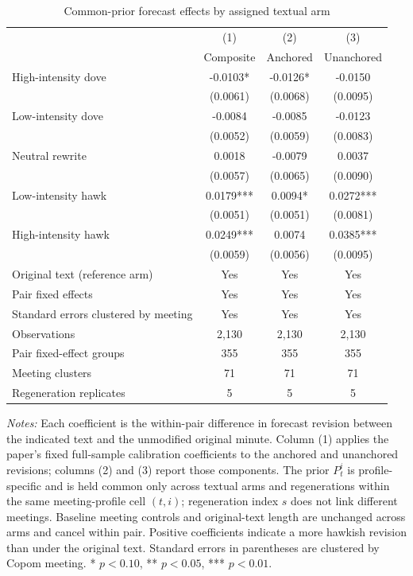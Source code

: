 \begin{table}[htbp]
\color{revisionred}
\centering
\begin{threeparttable}
\caption{Common-prior forecast effects by assigned textual arm}
\label{tab:common-prior-dose-arms}
\begin{footnotesize}
\begin{tabular}{lccc}
\toprule
 & (1) & (2) & (3) \\
 & Composite & Anchored & Unanchored \\
\midrule
High-intensity dove & -0.0103* & -0.0126* & -0.0150 \\
 & (0.0061) & (0.0068) & (0.0095) \\
Low-intensity dove & -0.0084 & -0.0085 & -0.0123 \\
 & (0.0052) & (0.0059) & (0.0083) \\
Neutral rewrite & 0.0018 & -0.0079 & 0.0037 \\
 & (0.0057) & (0.0065) & (0.0090) \\
Low-intensity hawk & 0.0179*** & 0.0094* & 0.0272*** \\
 & (0.0051) & (0.0051) & (0.0081) \\
High-intensity hawk & 0.0249*** & 0.0074 & 0.0385*** \\
 & (0.0059) & (0.0056) & (0.0095) \\
\midrule
Original text (reference arm) & Yes & Yes & Yes \\
Pair fixed effects & Yes & Yes & Yes \\
Standard errors clustered by meeting & Yes & Yes & Yes \\
Observations & 2,130 & 2,130 & 2,130 \\
Pair fixed-effect groups & 355 & 355 & 355 \\
Meeting clusters & 71 & 71 & 71 \\
Regeneration replicates & 5 & 5 & 5 \\
\bottomrule
\end{tabular}
\begin{tablenotes}[flushleft]
\scriptsize
\item \textit{Notes:} Each coefficient is the within-pair difference in forecast revision between the indicated text and the unmodified original minute. Column (1) applies the paper's fixed full-sample calibration coefficients to the anchored and unanchored revisions; columns (2) and (3) report those components. The prior $P_t^i$ is profile-specific and is held common only across textual arms and regenerations within the same meeting-profile cell $(t,i)$; regeneration index $s$ does not link different meetings. Baseline meeting controls and original-text length are unchanged across arms and cancel within pair. Positive coefficients indicate a more hawkish revision than under the original text. Standard errors in parentheses are clustered by Copom meeting. * $p<0.10$, ** $p<0.05$, *** $p<0.01$.
\end{tablenotes}
\end{footnotesize}
\end{threeparttable}
\end{table}
